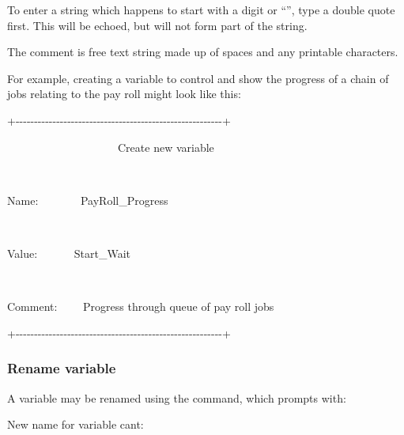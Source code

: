 To enter a string which happens to start with a digit or
``\exampletext{{}-}'', type a double
quote first. This will be echoed, but will not form part of the string.

The comment is free text string made up of spaces and any printable
characters.

For example, creating a variable to control and show the progress of a
chain of jobs relating to the pay roll might look like this:

\pagebreak[20]
\begin{exparasmall}

+-{}-{}-{}-{}-{}-{}-{}-{}-{}-{}-{}-{}-{}-{}-{}-{}-{}-{}-{}-{}-{}-{}-{}-{}-{}-{}-{}-{}-{}-{}-{}-{}-{}-{}-{}-{}-{}-{}-{}-{}-{}-{}-{}-{}-{}-{}-{}-{}-{}-{}-{}-{}-{}-{}-{}-+

{\textbar} \ \ \ \ \ \ \ \ \ \ \ \ \ \ \ \ \ \ \ \ Create new variable
\ \ \ \ \ \ \ \ \ \ \ \ \ \ \ {\textbar}

{\textbar}
\ \ \ \ \ \ \ \ \ \ \ \ \ \ \ \ \ \ \ \ \ \ \ \ \ \ \ \ \ \ \ \ \ \ \ \ \ \ \ \ \ \ \ \ \ \ \ \ \ \ \ \ \ \ \ {\textbar}

{\textbar}Name: \ \ \ \ \ \ \ PayRoll\_Progress
\ \ \ \ \ \ \ \ \ \ \ \ \ \ \ \ \ \ \ \ \ \ \ \ \ {\textbar}

{\textbar}
\ \ \ \ \ \ \ \ \ \ \ \ \ \ \ \ \ \ \ \ \ \ \ \ \ \ \ \ \ \ \ \ \ \ \ \ \ \ \ \ \ \ \ \ \ \ \ \ \ \ \ \ \ \ \ {\textbar}

{\textbar}Value: \ \ \ \ \ \ {\textquotedbl}Start\_Wait
\ \ \ \ \ \ \ \ \ \ \ \ \ \ \ \ \ \ \ \ \ \ \ \ \ \ \ \ \ \ {\textbar}

{\textbar}
\ \ \ \ \ \ \ \ \ \ \ \ \ \ \ \ \ \ \ \ \ \ \ \ \ \ \ \ \ \ \ \ \ \ \ \ \ \ \ \ \ \ \ \ \ \ \ \ \ \ \ \ \ \ \ {\textbar}

{\textbar}Comment: \ \ \ \ Progress through queue of pay roll jobs
\ \ {\textbar}

+-{}-{}-{}-{}-{}-{}-{}-{}-{}-{}-{}-{}-{}-{}-{}-{}-{}-{}-{}-{}-{}-{}-{}-{}-{}-{}-{}-{}-{}-{}-{}-{}-{}-{}-{}-{}-{}-{}-{}-{}-{}-{}-{}-{}-{}-{}-{}-{}-{}-{}-{}-{}-{}-{}-{}-+

\end{exparasmall}

\subsubsection{Rename variable}
A variable may be renamed using the  command, which prompts with:

\begin{expara}

New name for variable cant:

\end{expara}

